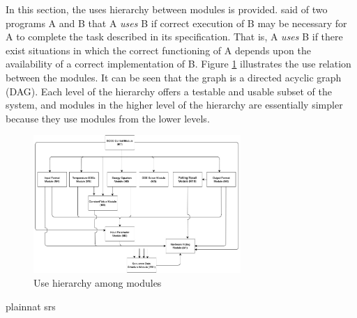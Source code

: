 \documentclass[12pt, titlepage]{article}
\begin{document}
In this section, the uses hierarchy between modules is
provided. \citet{Parnas1978} said of two programs A and B that A {\em uses} B if
correct execution of B may be necessary for A to complete the task described in
its specification. That is, A {\em uses} B if there exist situations in which
the correct functioning of A depends upon the availability of a correct
implementation of B.  Figure \ref{FigUH} illustrates the use relation between
the modules. It can be seen that the graph is a directed acyclic graph
(DAG). Each level of the hierarchy offers a testable and usable subset of the
system, and modules in the higher level of the hierarchy are essentially simpler
because they use modules from the lower levels.

\begin{figure}[H]
\centering
\includegraphics[width=0.7\textwidth]{HierchyModule.jpg}
\caption{Use hierarchy among modules}
\label{FigUH}
\end{figure}

\newpage
 {plainnat}
 {srs}

\newpage{}
\end{document}

